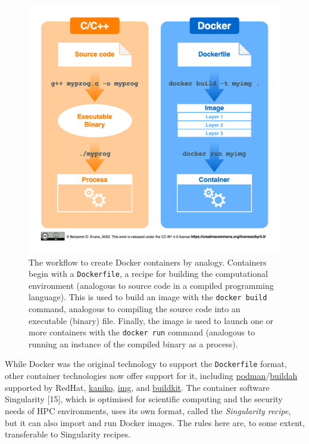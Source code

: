 \documentclass[10pt,letterpaper]{article}
\begin{document}
\begin{figure}[h]

{\centering \includegraphics[width=1\linewidth]{figures/analogy} 

}

\caption{The workflow to create Docker containers by analogy. Containers begin with a \texttt{Dockerfile}, a recipe for building the computational environment (analogous to source code in a compiled programming language). This is used to build an image with the \texttt{docker build} command, analogous to compiling the source code into an executable (binary) file. Finally, the image is used to launch one or more containers with the \texttt{docker run} command (analogous to running an instance of the compiled binary as a process).}\label{fig:analogy}
\end{figure}

While Docker was the original technology to support the
\texttt{Dockerfile} format, other container technologies now offer
support for it, including
\href{https://podman.io/}{podman}/\href{https://github.com/containers/buildah}{buildah}
supported by RedHat,
\href{https://github.com/GoogleContainerTools/kaniko}{kaniko},
\href{https://github.com/genuinetools/img}{img}, and
\href{https://github.com/moby/buildkit}{buildkit}. The container
software Singularity {[}15{]}, which is optimised for scientific
computing and the security needs of HPC environments, uses its own
format, called the \emph{Singularity recipe}, but it can also import and
run Docker images. The rules here are, to some extent, transferable to
Singularity recipes.
\end{document}
